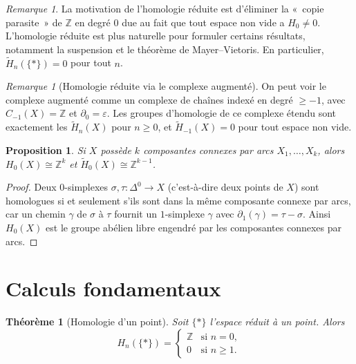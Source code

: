 \documentclass[12pt,a4paper,openany]{book}
\theoremstyle{definition}
\theoremstyle{plain}
\newtheorem{theoreme}[definition]{Théorème}
\newtheorem{proposition}[definition]{Proposition}
\theoremstyle{remark}
\newtheorem{remarque}[definition]{Remarque}
\newcommand{\Z}{\mathbb{Z}}
\begin{document}
\begin{remarque}\label{rem:homologie-reduite-motivation}
La motivation de l'homologie réduite est d'éliminer la «~copie parasite~» de $\Z$ en degré $0$
due au fait que tout espace non vide a $H_0 \neq 0$. L'homologie réduite est plus naturelle
pour formuler certains résultats, notamment la suspension et le théorème de Mayer--Vietoris.
En particulier, $\widetilde{H}_n(\{*\}) = 0$ pour tout $n$.
\end{remarque}

\begin{remarque}[Homologie réduite via le complexe augmenté]\label{rem:reduite-augmente}
On peut voir le complexe augmenté comme un complexe de chaînes indexé en degré $\geq -1$,
avec $C_{-1}(X) = \Z$ et $\partial_0 = \varepsilon$. Les groupes d'homologie de ce complexe
étendu sont exactement les $\widetilde{H}_n(X)$ pour $n \geq 0$, et $\widetilde{H}_{-1}(X) = 0$
pour tout espace non vide.
\end{remarque}

\begin{proposition}\label{prop:H0-composantes}
Si $X$ possède $k$ composantes connexes par arcs $X_1, \ldots, X_k$, alors
$H_0(X) \cong \Z^k$ et $\widetilde{H}_0(X) \cong \Z^{k-1}$.
\end{proposition}

\begin{proof}
Deux $0$-simplexes $\sigma, \tau \colon \Delta^0 \to X$ (c'est-à-dire deux points de $X$) sont
homologues si et seulement s'ils sont dans la même composante connexe par arcs, car un chemin
$\gamma$ de $\sigma$ à $\tau$ fournit un $1$-simplexe $\gamma$ avec $\partial_1(\gamma) = \tau - \sigma$.
Ainsi $H_0(X)$ est le groupe abélien libre engendré par les composantes connexes par arcs.
\end{proof}

\section{Calculs fondamentaux}\label{sec:calculs-fondamentaux}

\begin{theoreme}[Homologie d'un point]\label{thm:homologie-point}
Soit $\{*\}$ l'espace réduit à un point. Alors
\[
  H_n(\{*\}) = \begin{cases} \Z & \text{si } n = 0, \\ 0 & \text{si } n \geq 1. \end{cases}
\]
\end{theoreme}
\end{document}
